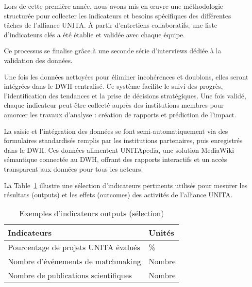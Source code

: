 Lors de cette première année, nous avons mis en œuvre une méthodologie structurée pour collecter les indicateurs et besoins spécifiques des différentes tâches de l’alliance UNITA. À partir d'entretiens collaboratifs, une liste d’indicateurs clés a été établie et validée avec chaque équipe.

Ce processus se finalise grâce à une seconde série d’interviews dédiée à la validation des données.

Une fois les données nettoyées pour éliminer incohérences et doublons, elles seront intégrées dans le DWH centralisé. Ce système facilite le suivi des progrès, l’identification des tendances et la prise de décisions stratégiques. Une fois validé, chaque indicateur peut être collecté auprès des institutions membres pour amorcer les travaux d’analyse : création de rapports et prédiction de l’impact.

La saisie et l’intégration des données se font semi-automatiquement via des formulaires standardisés remplis par les institutions partenaires, puis enregistrés dans le DWH. Ces données alimentent UNITApedia, une solution MediaWiki sémantique connectée au DWH, offrant des rapports interactifs et un accès transparent aux données pour tous les acteurs.

La Table~\ref{tab:indic_ex} illustre une sélection d’indicateurs pertinents utilisés pour mesurer les résultats (outputs) et les effets (outcomes) des activités de l’alliance UNITA.
\vspace{-16px}
\begin{table}[h]
    \caption{Exemples d’indicateurs outputs (sélection)}
    \centering
    \begin{tabular}{|l|l|}
        \hline
        \textbf{Indicateurs} & \textbf{Unités} \\ \hline
        Pourcentage de projets UNITA évalués & \% \\ \hline
        Nombre d’événements de matchmaking & Nombre \\ \hline
        Nombre de publications scientifiques & Nombre \\ \hline
    \end{tabular}
    \label{tab:indic_ex}
\end{table}
\vspace{-22px}